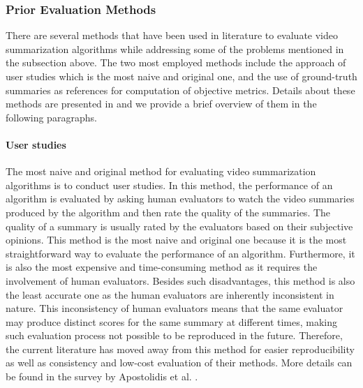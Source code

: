 	\subsubsection{Prior Evaluation Methods}
	\label{subsubsec:rel-evaluation-prior}
		There are several methods that have been used in literature to evaluate video summarization algorithms while addressing some of the problems mentioned in the subsection above. The two most employed methods include the approach of user studies which is the most naive and original one, and the use of ground-truth summaries as references for computation of objective metrics. Details about these methods are presented in \cite{Apostolidis2021Video} and we provide a brief overview of them in the following paragraphs.

		\paragraph[short]{User studies}
			The most naive and original method for evaluating video summarization algorithms is to conduct user studies. In this method, the performance of an algorithm is evaluated by asking human evaluators to watch the video summaries produced by the algorithm and then rate the quality of the summaries. The quality of a summary is usually rated by the evaluators based on their subjective opinions. This method is the most naive and original one because it is the most straightforward way to evaluate the performance of an algorithm. Furthermore, it is also the most expensive and time-consuming method as it requires the involvement of human evaluators. Besides such disadvantages, this method is also the least accurate one as the human evaluators are inherently inconsistent in nature. This inconsistency of human evaluators means that the same evaluator may produce distinct scores for the same summary at different times, making such evaluation process not possible to be reproduced in the future. Therefore, the current literature has moved away from this method for easier reproducibility as well as consistency and low-cost evaluation of their methods. More details can be found in the survey by Apostolidis et al. \cite{Apostolidis2021Video}.

